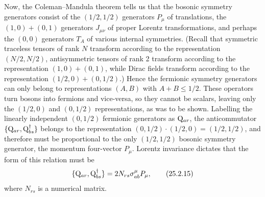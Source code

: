 Now, the Coleman--Mandula theorem tells us that the bosonic symmetry
generators consist of the \((1/2,1/2)\) generators \(P_\mu\) of
translations, the \((1,0)+(0,1)\) generators \(J_{\mu\nu}\) of proper
Lorentz transformations, and perhaps the \((0,0)\) generators \(T_A\) of
various internal symmetries. (Recall that symmetric traceless tensors of rank
\(N\) transform according to the representation \((N/2,N/2)\),
antisymmetric tensors of rank 2 transform according to the representation
\((1,0)+(0,1)\), while Dirac fields transform according to the
representation \((1/2,0)+(0,1/2)\).) Hence the fermionic symmetry generators
can only belong to representations \((A,B)\) with \(A+B\leq1/2\). These
operators turn bosons into fermions and vice-versa, so they cannot be
scalars, leaving only the \((1/2,0)\) and \((0,1/2)\) representations, as
was to be shown. Labelling the linearly independent \((0,1/2)\) fermionic
generators as \(\mathrm{Q}_{ar}\), the anticommutator
\(\{\mathrm{Q}_{ar},\mathrm{Q}_{bs}^\dagger\}\) belongs to the representation
\((0,1/2)\cdot(1/2,0)=(1/2,1/2)\), and therefore must be proportional to
the only \((1/2,1/2)\) bosonic symmetry generator, the momentum four-vector
\(P_\mu\). Lorentz invariance dictates that the form of this relation must
be
\begin{equation}
\{\mathrm{Q}_{ar},\mathrm{Q}_{bs}^\dagger\}
=2N_{rs}\sigma^\mu_{ab}P_\mu,
\tag{25.2.15}\label{eq:25.2.15}
\end{equation}
where \(N_{rs}\) is a numerical matrix.

